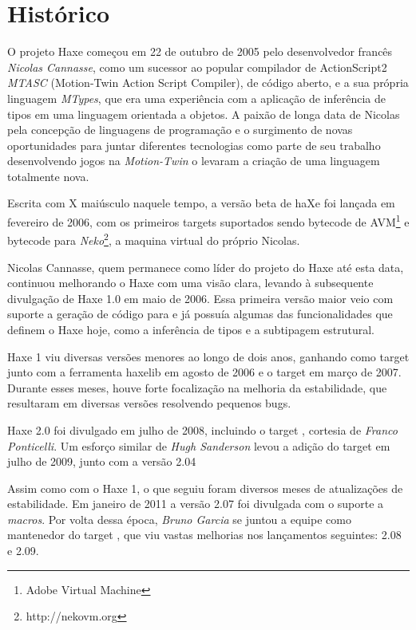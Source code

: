 \section{Histórico}
\label{introduction-haxe-history}

O projeto Haxe começou em 22 de outubro de 2005 pelo desenvolvedor francês \emph{Nicolas Cannasse}, como um sucessor ao popular compilador de ActionScript2 \emph{MTASC} (Motion-Twin Action Script Compiler), de código aberto, e a sua própria linguagem \emph{MTypes}, que era uma experiência com a aplicação de inferência de tipos em uma linguagem orientada a objetos. A paixão de longa data de Nicolas pela concepção de linguagens de programação e o surgimento de novas oportunidades para juntar diferentes tecnologias como parte de seu trabalho desenvolvendo jogos na \emph{Motion-Twin} o levaram a criação de uma linguagem totalmente nova.

Escrita com X maiúsculo naquele tempo, a versão beta de haXe foi lançada em fevereiro de 2006, com os primeiros targets suportados sendo bytecode de AVM\footnote{Adobe Virtual Machine} e bytecode para \emph{Neko}\footnote{http://nekovm.org}, a maquina virtual do próprio Nicolas.

Nicolas Cannasse, quem permanece como líder do projeto do Haxe até esta data, continuou melhorando o Haxe com uma visão clara, levando à subsequente divulgação de Haxe 1.0 em maio de 2006. Essa primeira versão maior veio com suporte a geração de código para  e já possuía algumas das funcionalidades que definem o Haxe hoje, como a inferência de tipos e a subtipagem estrutural.

Haxe 1 viu diversas versões menores ao longo de dois anos, ganhando  como target junto com a ferramenta {haxelib} em agosto de 2006 e o target em março de 2007. Durante esses meses, houve forte focalização na melhoria da estabilidade, que resultaram em diversas versões resolvendo pequenos bugs.

Haxe 2.0 foi divulgado em julho de 2008, incluindo o target , cortesia de \emph{Franco Ponticelli}. Um esforço similar de \emph{Hugh Sanderson} levou a adição do target  em julho de 2009, junto com a versão 2.04

Assim como com o Haxe 1, o que seguiu foram diversos meses de atualizações de estabilidade. Em janeiro de 2011 a versão 2.07 foi divulgada com o suporte a \emph{macros}. Por volta dessa época, \emph{Bruno Garcia} se juntou a equipe como mantenedor do target , que viu vastas melhorias nos lançamentos seguintes: 2.08 e 2.09.

